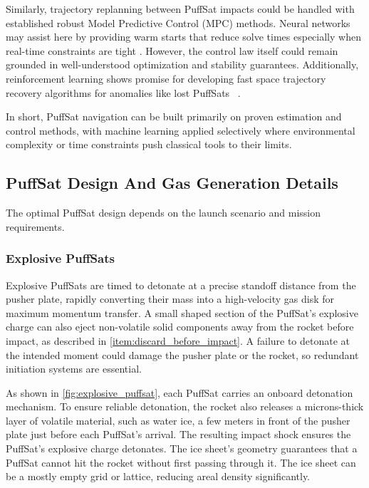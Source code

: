 \documentclass{article}
\begin{document}
Similarly, trajectory replanning between PuffSat impacts could be handled with established robust Model Predictive Control (MPC) methods.  Neural networks may assist here by providing warm starts that reduce solve times \cite{guffanti2024transformerstrajectoryoptimizationapplication} especially when real-time constraints are tight \cite{briden_constraint}.  However, the control law itself could remain grounded in well-understood optimization and stability guarantees.     Additionally, reinforcement learning shows promise for developing fast space trajectory recovery algorithms for anomalies like lost PuffSats \ \cite{zavoli2021reinforcement}.   

In short, PuffSat navigation can be built primarily on proven estimation and control methods, with machine learning applied selectively where environmental complexity or time constraints push classical tools to their limits.

\subsection{PuffSat Design And Gas Generation Details}\label{sec:puffsat_design}
The optimal PuffSat design depends on the launch scenario and mission requirements.
\subsubsection{Explosive PuffSats} \label{sec:explosive_puffsat}
Explosive PuffSats are timed to detonate at a precise standoff distance from the pusher plate, rapidly converting their mass into a high-velocity gas disk for maximum momentum transfer. A small shaped section of the PuffSat's explosive charge can also eject non-volatile solid components away from the rocket before impact, as described in \autoref{item:discard_before_impact}.  A failure to detonate at the intended moment could damage the pusher plate or the rocket, so redundant initiation systems are essential.

As shown in \autoref{fig:explosive_puffsat}, each PuffSat carries an onboard detonation mechanism. To ensure reliable detonation, the rocket also releases a microns-thick layer of volatile material, such as water ice, a few meters in front of the pusher plate just before each PuffSat's arrival. The resulting impact shock ensures the PuffSat’s explosive charge detonates. The ice sheet’s geometry guarantees that a PuffSat cannot hit the rocket without first passing through it.  The ice sheet can be a mostly empty grid or lattice, reducing areal density significantly.
\end{document}
